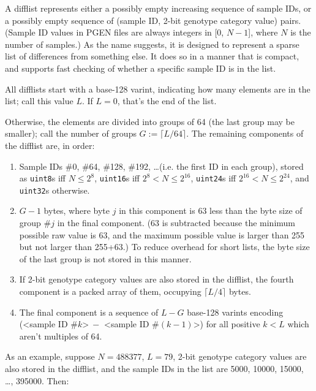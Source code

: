 \documentclass[8pt]{article}
\begin{document}
A difflist represents either a possibly empty increasing sequence of sample
IDs, or a possibly empty sequence of (sample ID, 2-bit genotype category value)
pairs.  (Sample ID values in PGEN files are always integers in [0, $N-1$],
where $N$ is the number of samples.)  As the name suggests, it is designed to
represent a sparse list of differences from something else.  It does so in a
manner that is compact, and supports fast checking of whether a specific sample
ID is in the list.

All difflists start with a base-128 varint, indicating how many elements are in
the list; call this value $L$.  If $L=0$, that's the end of the list.

Otherwise, the elements are divided into groups of 64 (the last group may be
smaller); call the number of groups $G:=\lceil L/64\rceil $.  The remaining
components of the difflist are, in order:

\begin{enumerate}
\item Sample IDs \#0, \#64, \#128, \#192, \ldots (i.e. the first ID in each
  group), stored as \texttt{uint8}s iff $N\leq 2^8$, \texttt{uint16}s iff
  $2^8<N\leq 2^{16}$, \texttt{uint24}s iff $2^{16}<N\leq 2^{24}$, and
  \texttt{uint32}s otherwise.
\item $G-1$ bytes, where byte $j$ in this component is 63 less than the byte
  size of group \#$j$ in the final component.  (63 is subtracted because the
  minimum possible raw value is 63, and the maximum possible value is larger
  than 255 but not larger than 255+63.)  To reduce overhead for short lists,
  the byte size of the last group is not stored in this manner.
\item If 2-bit genotype category values are also stored in the difflist, the
  fourth component is a packed array of them, occupying $\lceil L/4\rceil $
  bytes.
\item The final component is a sequence of $L-G$ base-128 varints encoding
  (\textless sample ID \#$k$\textgreater $\>-$ \textless sample ID
  \#$(k-1)$\textgreater) for all positive $k<L$ which aren't multiples of 64.
\end{enumerate}

As an example, suppose $N=488377$, $L=79$, 2-bit genotype category values are
also stored in the difflist, and the sample IDs in the list are 5000, 10000,
15000, \ldots , 395000.  Then:
\end{document}
